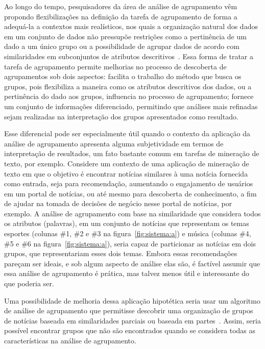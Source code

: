 \documentclass[
    12pt,                %
    oneside,            %
    a4paper,            %
    english,            %
    brazil                %
    ]{abntex2ppgsi}
\begin{document}
Ao longo do tempo, pesquisadores da área de análise de agrupamento vêm propondo flexibilizações na definição da tarefa de agrupamento de forma a adequá-la a contextos mais realísticos, nos quais a organização natural dos dados em um conjunto de dados não pressupõe restrições como a pertinência de um dado a um único grupo ou a possibilidade de agrupar dados de acordo com similaridades em subconjuntos de atributos descritivos~\cite{Bezdek1981,Han2011,Peres2012}.
Essa forma de tratar a tarefa de agrupamento permite melhorias no processo de descoberta de agrupamentos sob dois aspectos: facilita o trabalho do método que busca os grupos, pois flexibiliza a maneira como os atributos descritivos dos dados, ou a pertinência do dado aos grupos, influencia no processo de agrupamento; fornece um conjunto de informações diferenciado, permitindo que análises mais refinadas sejam realizadas na interpretação dos grupos apresentados como resultado.

Esse diferencial pode ser especialmente útil quando o contexto da aplicação da análise de agrupamento apresenta alguma subjetividade em termos de interpretação de resultados, um fato bastante comum em tarefas de mineração de texto, por exemplo.
Considere um contexto de uma aplicação de mineração de texto em que o objetivo é encontrar notícias similares à uma notícia fornecida como entrada, seja para recomendação, aumentando o engajamento de usuários em um portal de notícias, ou até mesmo para descoberta de conhecimento, a fim de ajudar na tomada de decisões de negócio nesse portal de notícias, por exemplo.
A análise de agrupamento com base na similaridade que considera todos os atributos (palavras), em um conjunto de notícias que representam os temas esportes (colunas \#1, \#2 e \#3 na figura~\ref{fig:sistema:a}) e música (colunas \#4, \#5 e \#6 na figura~\ref{fig:sistema:a}), seria capaz de particionar as notícias em dois grupos, que representariam esses dois temas.
Embora essas recomendações pareçam ser ideais, e sob algum aspecto de análise elas são, é factível assumir que essa análise de agrupamento é prática, mas talvez menos útil e interessante do que poderia ser.

Uma possibilidade de melhoria dessa aplicação hipotética seria usar um algoritmo de análise de agrupamento que permitisse descobrir uma organização de grupos de notícias baseada em similaridades parciais ou baseada em partes~\cite{Franca2010,Ho2008}.
Assim, seria possível encontrar grupos que não são encontrados quando se considera todas as características na análise de agrupamento.
\end{document}
